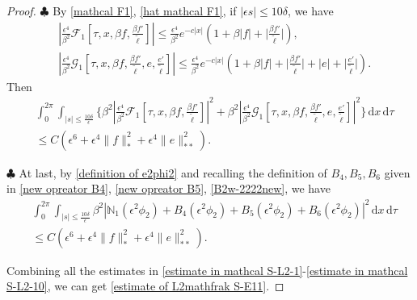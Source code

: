 \documentclass[10pt, reqno]{amsart}
\numberwithin{equation}{section}
\theoremstyle{definition}
\begin{document}
{{\begin{proof}
 \smallskip\noindent$\clubsuit$
 By \eqref{mathcal F1}, \eqref{hat mathcal F1},  if $ |\epsilon s| \le 10\delta$, we have
\begin{align*}
 &\left|\frac{\epsilon^4}{\beta^2} \mathcal F_1\left[\tau, x, \beta f, \frac{\beta f'}{\tilde\ell}\right] \right| \le \frac{\epsilon^4}{\beta^2} e^{-c|x|} \left( 1+ \beta |f| +\Big|\frac{\beta f'}{\tilde\ell}\Big| \right),
 \\[2mm]
 &\left| \frac{\epsilon^4} {\beta^2} \mathcal G_1\left[\tau, x, \beta f, \frac{\beta f'}{\tilde\ell}, e, \frac{e'}{\tilde\ell}\right]\right| \le \frac{\epsilon^4}{\beta^2} e^{-c|x|} \left( 1+ \beta |f| +\Big|\frac{\beta f'}{\tilde\ell}\Big| + |e| + \Big|\frac{e'}{\tilde\ell}\Big| \right).
\end{align*}
Then
\begin{align} \label{estimate in mathcal S-L2-9}
& \int_0^{2\pi} \int_{|s| \le \frac{10\delta} \epsilon}\Bigg\{ \beta^2\left|\frac{\epsilon^4}{\beta^2} \mathcal F_1\left[\tau, x, \beta f, \frac{\beta f'}{\tilde\ell}\right] \right|^2 + \beta^2\left| \frac{\epsilon^4} {\beta^2} \mathcal G_1\left[\tau, x, \beta f, \frac{\beta f'}{\tilde\ell}, e, \frac{e'}{\tilde\ell}\right]\right|^2\Bigg\} \,{\mathrm d}x \,{\mathrm d}\tau
\nonumber\\[2mm]
&
\le C \left(\epsilon^6+ \epsilon^4 \|f\|_*^2+ \epsilon^4\|e\|_{**}^2 \right).
\end{align}


\smallskip\noindent$\clubsuit$
At last, by \eqref{definition of e2phi2} and recalling the definition of $B_4, B_5, B_6$ given in \eqref{new opreator B4}, \eqref{new opreator B5}, \eqref{B2w-2222new}, we have
\begin{align} \label{estimate in mathcal S-L2-10}
 & \int_0^{2\pi} \int_{|s| \le \frac{10\delta} \epsilon} \beta^2
 \left| \mathbb{N}_1 (\epsilon^2 \phi_2)
+ B_4(\epsilon^2\phi_2)+ B_5 (\epsilon^2{\phi_2})+ B_6 (\epsilon^2{\phi_2}) \right|^2 \,{\mathrm d}x \,{\mathrm d}\tau
\nonumber\\[2mm]
&
\le C \left(\epsilon^6+ \epsilon^4 \|f\|_*^2+ \epsilon^4\|e\|_{**}^2 \right).
\end{align}


 Combining all the estimates in \eqref{estimate in mathcal S-L2-1}-\eqref{estimate in mathcal S-L2-10},
we can get \eqref{estimate of L2mathfrak S-E11}.
\end{proof}





}}
\end{document}
